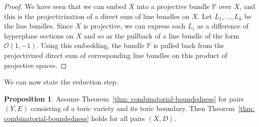 \documentclass[11pt]{amsart}
\theoremstyle{definition}
\theoremstyle{definition}
\newtheorem{proposition}[theorem]{Proposition}
\begin{document}
\begin{proof}
We have seen that we can embed $X$ into a projective bundle $\mathbb P$ over $X$, and this is the projectivization of a direct sum of line bundles on $X$. Let $L_1,\ldots, L_k$ be the line bundles. Since $X$ is projective, we can express each $L_i$ as a difference of hyperplane sections on $X$ and so as the pullback of a line bundle of the form $\mathcal O(1,-1)$. Using this embedding, the bundle $\mathbb P$ is pulled back from the projectivized direct sum of corresponding line bundles on this product of projective spaces. 
\end{proof}

We can now state the reduction step. 

\begin{proposition}\label{prop:Toric Case Enough}
Assume Theorem~\ref{thm: combinatorial-boundedness} for pairs $(Y,E)$ consisting of a toric variety and its toric boundary. Then Theorem~\ref{thm: combinatorial-boundedness} holds for all pairs $(X,D)$. 
\end{proposition}
\end{document}
